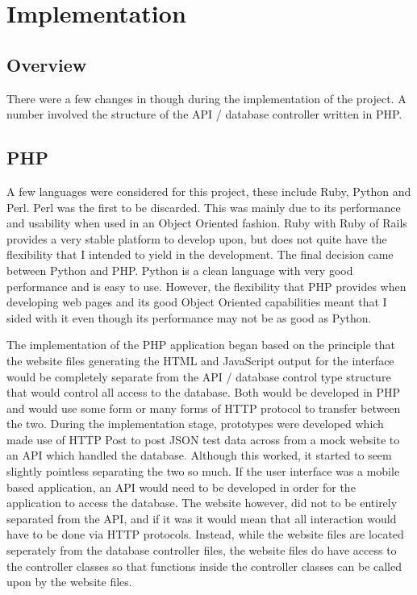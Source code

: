 \chapter{Implementation}

\section{Overview}
	There were a few changes in though during the implementation of the project. A number involved the structure of the API / database controller written in PHP. 
	
\section{PHP}
	A few languages were considered for this project, these include Ruby, Python and Perl. Perl was the first to be discarded. This was mainly due to its performance and usability when used in an Object Oriented fashion. Ruby with Ruby of Rails provides a very stable platform to develop upon, but does not quite have the flexibility that I intended to yield in the development. The final decision came between Python and PHP. Python is a clean language with very good performance and is easy to use. However, the flexibility that PHP provides when developing web pages and its good Object Oriented capabilities meant that I sided with it even though its performance may not be as good as Python.
	
	The implementation of the PHP application began based on the principle that the website files generating the HTML and JavaScript output for the interface would be completely separate from the API / database control type structure that would control all access to the database. Both would be developed in PHP and would use some form or many forms of HTTP protocol to transfer between the two. During the implementation stage, prototypes were developed which made use of HTTP Post to post JSON test data across from a mock website to an API which handled the database. Although this worked, it started to seem slightly pointless separating the two so much. If the user interface was a mobile based application, an API would need to be developed in order for the application to access the database. The website however, did not to be entirely separated from the API, and if it was it would mean that all interaction would have to be done via HTTP protocols. Instead, while the website files are located seperately from the database controller files, the website files do have access to the controller classes so that functions inside the controller classes can be called upon by the website files. 
	
